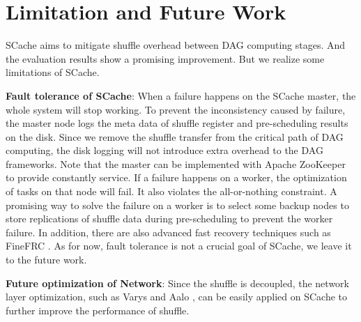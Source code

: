 \section{Limitation and Future Work}
SCache aims to mitigate shuffle overhead between DAG computing stages. And the evaluation results show a promising improvement. But we realize some limitations of SCache.

\textbf{Fault tolerance of SCache}: When a failure happens on the SCache master, the whole system will stop working. To prevent the inconsistency caused by failure, the master node logs the meta data of shuffle register and pre-scheduling results on the disk. Since we remove the shuffle transfer from the critical path of DAG computing, the disk logging will not introduce extra overhead to the DAG frameworks. Note that the master can be implemented with Apache ZooKeeper to provide constantly service. If a failure happens on a worker, the optimization of tasks on that node will fail. It also violates the all-or-nothing constraint. A promising way to solve the failure on a worker is to select some backup nodes to store replications of shuffle data during pre-scheduling to prevent the worker failure. In addition, there are also advanced fast recovery techniques such as FineFRC \cite{finefrc}. As for now, fault tolerance is not a crucial goal of SCache,  we leave it to the future work.


\textbf{Future optimization of Network}: Since the shuffle is decoupled, the network layer optimization, such as Varys \cite{varys} and Aalo \cite{aalo}, can be easily applied on SCache to further improve the performance of shuffle.